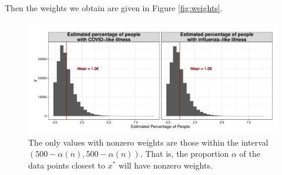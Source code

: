 \documentclass[12pt,twoside]{smiththesis}
\begin{document}
Then the weights we obtain are given in Figure \ref{fig:weights}.
\begin{figure}

{\centering \includegraphics{thesis_files/figure-latex/unnamed-chunk-28-1} 

}

\caption{\label{fig:weights} The only values with nonzero weights are those within the interval $(500 - \alpha (n), 500 - \alpha (n))$. That is, the proportion $\alpha$ of the data points closest to $x^*$ will have nonzero weights.}\label{fig:unnamed-chunk-28}
\end{figure}
\newpage
\end{document}
